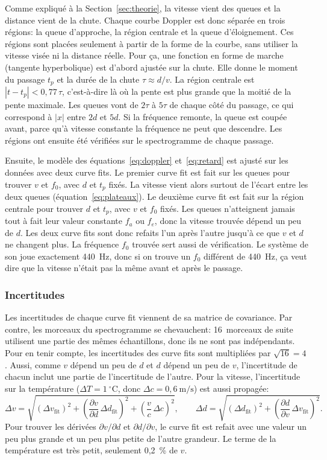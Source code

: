 \documentclass[11pt,letterpaper]{article}
\newcommand{\beq}[1]{\begin{equation} \label{#1}}
\def\enq{\end{equation}}
\begin{document}
Comme expliqué à la Section~\ref{sec:theorie}, la vitesse vient des queues et la distance vient de la chute. Chaque courbe Doppler est donc séparée en trois régions: la queue d'approche, la région centrale et la queue d'éloignement. Ces régions sont placées seulement à partir de la forme de la courbe, sans utiliser la vitesse visée ni la distance réelle. Pour ça, une fonction en forme de marche (tangente hyperbolique) est d'abord ajustée sur la chute. Elle donne le moment du passage $t_p$ et la durée de la chute $\tau \approx d/v$. La région centrale est $|t - t_p| < 0{,}77\,\tau$, c'est-à-dire là où la pente est plus grande que la moitié de la pente maximale. Les queues vont de $2\tau$ à $5\tau$ de chaque côté du passage, ce qui correspond à $|x|$ entre $2d$ et $5d$. Si la fréquence remonte, la queue est coupée avant, parce qu'à vitesse constante la fréquence ne peut que descendre. Les régions ont ensuite été vérifiées sur le spectrogramme de chaque passage.

Ensuite, le modèle des équations~\ref{eq:doppler} et~\ref{eq:retard} est ajusté sur les données avec deux curve fits. Le premier curve fit est fait sur les queues pour trouver $v$ et $f_0$, avec $d$ et $t_p$ fixés. La vitesse vient alors surtout de l'écart entre les deux queues (équation~\ref{eq:plateaux}). Le deuxième curve fit est fait sur la région centrale pour trouver $d$ et $t_p$, avec $v$ et $f_0$ fixés. Les queues n'atteignent jamais tout à fait leur valeur constante $f_a$ ou $f_e$, donc la vitesse trouvée dépend un peu de $d$. Les deux curve fits sont donc refaits l'un après l'autre jusqu'à ce que $v$ et $d$ ne changent plus. La fréquence $f_0$ trouvée sert aussi de vérification. Le système de son joue exactement 440~Hz, donc si on trouve un $f_0$ différent de 440~Hz, ça veut dire que la vitesse n'était pas la même avant et après le passage.

\subsubsection*{Incertitudes}
Les incertitudes de chaque curve fit viennent de sa matrice de covariance. Par contre, les morceaux du spectrogramme se chevauchent: 16~morceaux de suite utilisent une partie des mêmes échantillons, donc ils ne sont pas indépendants. Pour en tenir compte, les incertitudes des curve fits sont multipliées par $\sqrt{16} = 4$. Aussi, comme $v$ dépend un peu de $d$ et $d$ dépend un peu de $v$, l'incertitude de chacun inclut une partie de l'incertitude de l'autre. Pour la vitesse, l'incertitude sur la température ($\Delta T = 1~^\circ\text{C}$, donc $\Delta c = 0{,}6~\text{m/s}$) est aussi propagée:
\beq{eq:incertitude}
    \Delta v = \sqrt{\left(\Delta v_{\text{fit}}\right)^2 + \left(\frac{\partial v}{\partial d}\,\Delta d_{\text{fit}}\right)^2 + \left(\frac{v}{c}\,\Delta c\right)^2} , \qquad
    \Delta d = \sqrt{\left(\Delta d_{\text{fit}}\right)^2 + \left(\frac{\partial d}{\partial v}\,\Delta v_{\text{fit}}\right)^2} .
\enq
Pour trouver les dérivées $\partial v/\partial d$ et $\partial d/\partial v$, le curve fit est refait avec une valeur un peu plus grande et un peu plus petite de l'autre grandeur. Le terme de la température est très petit, seulement 0,2~\% de $v$.
\end{document}
